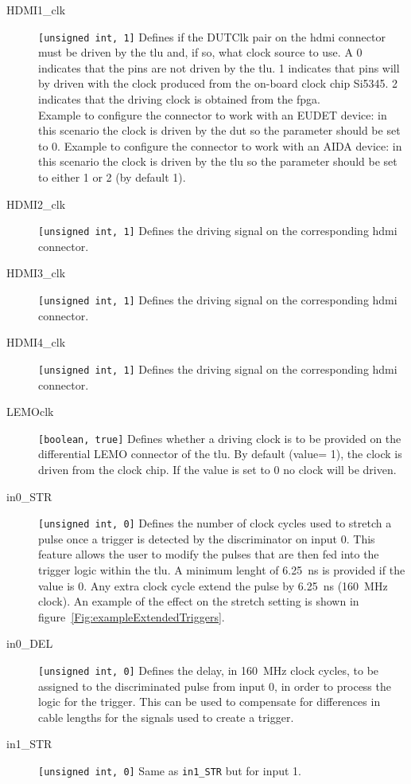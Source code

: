 \begin{description}
  \item[HDMI1\_clk] \verb|[unsigned int, 1]| Defines if the DUTClk pair on the \gls{hdmi} connector must be driven by the \gls{tlu} and, if so, what clock source to use. A 0 indicates that the pins are not driven by the \gls{tlu}. 1 indicates that pins will by driven with the clock produced from the on-board clock chip Si5345. 2 indicates that the driving clock is obtained from the \gls{fpga}.\\
      Example to configure the connector to work with an EUDET device: in this scenario the clock is driven by the \gls{dut} so the parameter should be set to 0.
      Example to configure the connector to work with an AIDA device: in this scenario the clock is driven by the \gls{tlu} so the parameter should be set to either 1 or 2 (by default 1).
  \item[HDMI2\_clk] \verb|[unsigned int, 1]| Defines the driving signal on the corresponding \gls{hdmi} connector.
  \item[HDMI3\_clk] \verb|[unsigned int, 1]| Defines the driving signal on the corresponding \gls{hdmi} connector.
  \item[HDMI4\_clk] \verb|[unsigned int, 1]| Defines the driving signal on the corresponding \gls{hdmi} connector.
  \item[LEMOclk] \verb|[boolean, true]| Defines whether a driving clock is to be provided on the differential LEMO connector of the \gls{tlu}. By default (value= 1), the clock is driven from the clock chip. If the value is set to 0 no clock will be driven.
  \item[in0\_STR] \verb|[unsigned int, 0]| Defines the number of clock cycles used to stretch a pulse once a trigger is detected by the discriminator on input 0. This feature allows the user to modify the pulses that are then fed into the trigger logic within the \gls{tlu}.
      A minimum lenght of 6.25~ns is provided if the value is 0. Any extra clock cycle extend the pulse by 6.25~ns (160~MHz clock). An example of the effect on the stretch setting is shown in figure~\ref{Fig:exampleExtendedTriggers}.
  \item[in0\_DEL] \verb|[unsigned int, 0]| Defines the delay, in 160~MHz clock cycles, to be assigned to the discriminated pulse from input 0, in order to process the logic for the trigger. This can be used to compensate for differences in cable lengths for the signals used to create a trigger.
  \item[in1\_STR] \verb|[unsigned int, 0]| Same as \texttt{in1\_STR} but for input 1.

\end{description}
